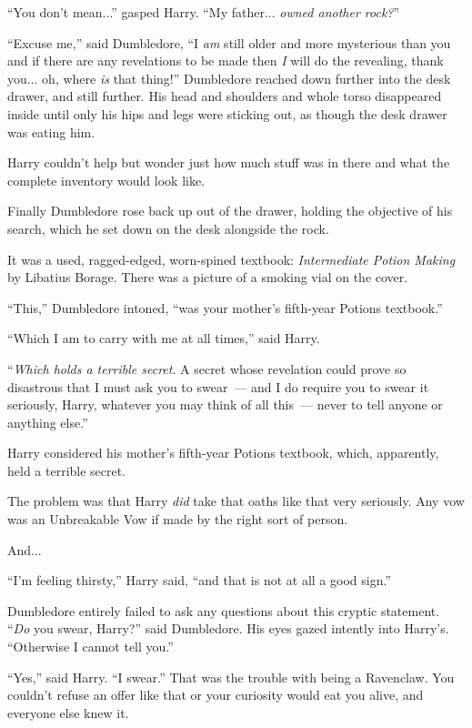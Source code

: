 ``You don't mean...'' gasped Harry. ``My father... \emph{owned another rock?}''

``Excuse me,'' said Dumbledore, ``I \emph{am} still older and more mysterious than you and if there are any revelations to be made then \emph{I} will do the revealing, thank you... oh, where \emph{is} that thing!'' Dumbledore reached down further into the desk drawer, and still further. His head and shoulders and whole torso disappeared inside until only his hips and legs were sticking out, as though the desk drawer was eating him.

Harry couldn't help but wonder just how much stuff was in there and what the complete inventory would look like.

Finally Dumbledore rose back up out of the drawer, holding the objective of his search, which he set down on the desk alongside the rock.

It was a used, ragged-edged, worn-spined textbook: \emph{Intermediate Potion Making} by Libatius Borage. There was a picture of a smoking vial on the cover.

``This,'' Dumbledore intoned, ``was your mother's fifth-year Potions textbook.''

``Which I am to carry with me at all times,'' said Harry.

``\emph{Which holds a terrible secret}. A secret whose revelation could prove so disastrous that I must ask you to swear~--- and I do require you to swear it seriously, Harry, whatever you may think of all this~--- never to tell anyone or anything else.''

Harry considered his mother's fifth-year Potions textbook, which, apparently, held a terrible secret.

The problem was that Harry \emph{did} take that oaths like that very seriously. Any vow was an Unbreakable Vow if made by the right sort of person.

And...

``I'm feeling thirsty,'' Harry said, ``and that is not at all a good sign.''

Dumbledore entirely failed to ask any questions about this cryptic statement. ``\emph{Do} you swear, Harry?'' said Dumbledore. His eyes gazed intently into Harry's. ``Otherwise I cannot tell you.''

``Yes,'' said Harry. ``I swear.'' That was the trouble with being a Ravenclaw. You couldn't refuse an offer like that or your curiosity would eat you alive, and everyone else knew it.

